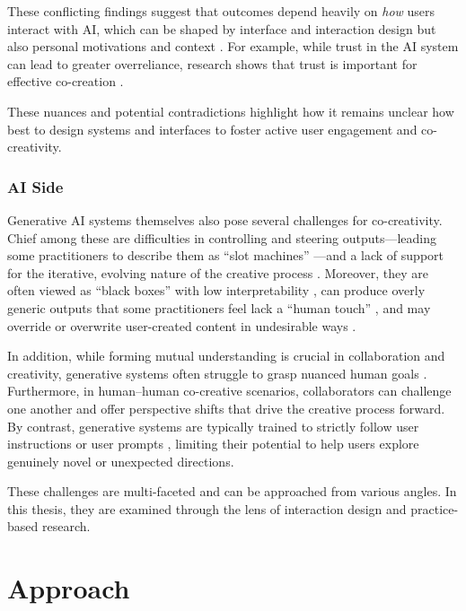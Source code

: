 These conflicting findings suggest that outcomes depend heavily on \emph{how} users interact with AI, which can be shaped by interface and interaction design but also personal motivations and context \cite{Lehmann2022-kr, Kantosalo2020-nh,Liapis2016-bv,Lin2023-jd,Karimi2020-cf,Moruzzi2024-cq, Rezwana2022-gg,Abbas2024-sf}. For example, while trust in the AI system can lead to greater overreliance, research shows that trust is important for effective co-creation \cite{McCormack2019-yh, Louie2020-aq, Kruger2017-xa, McCormack2020-ix, Hutchings2020-bv, Wang2020-cw, Rezwana2022-ui}. 

These nuances and potential contradictions highlight how it remains unclear how best to design systems and interfaces to foster active user engagement and co-creativity. 

\subsubsection{AI Side}
Generative AI systems themselves also pose several challenges for co-creativity. Chief among these are difficulties in controlling and steering outputs—leading some practitioners to describe them as “slot machines” \cite{Nebelong2023-rb}—and a lack of support for the iterative, evolving nature of the creative process \cite{Park2024-gw}. Moreover, they are often viewed as “black boxes” with low interpretability \cite{Llano2022-ti, El-Assady2022-qc}, can produce overly generic outputs that some practitioners feel lack a “human touch” \cite{Park2024-gw}, and may override or overwrite user-created content in undesirable ways \cite{Buschek2021-ks}.

In addition, while forming mutual understanding is crucial in collaboration and creativity, generative systems often struggle to grasp nuanced human goals \cite{Bown2024-yx}. Furthermore, in human–human co-creative scenarios, collaborators can challenge one another and offer perspective shifts that drive the creative process forward. By contrast, generative systems are typically trained to strictly follow user instructions \cite{OpenAI2022-pj} or user prompts \cite{Ramesh2022-kc}, limiting their potential to help users explore genuinely novel or unexpected directions.

These challenges are multi-faceted and can be approached from various angles. In this thesis, they are examined through the lens of interaction design and practice-based research. 

\section{Approach}

